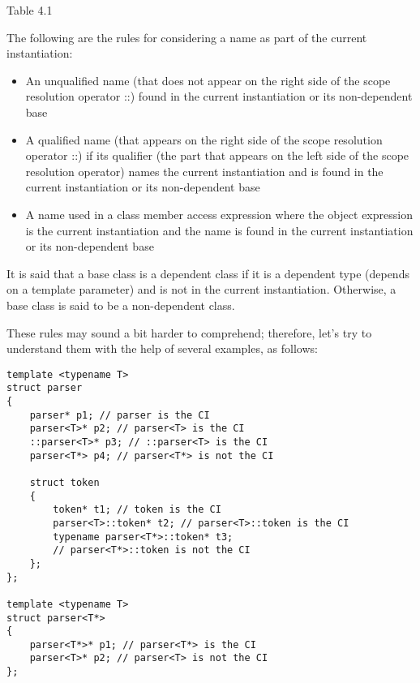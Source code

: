 \begin{center}
Table 4.1
\end{center}

The following are the rules for considering a name as part of the current instantiation:

\begin{itemize}
\item
An unqualified name (that does not appear on the right side of the scope resolution operator ::) found in the current instantiation or its non-dependent base

\item
A qualified name (that appears on the right side of the scope resolution operator ::) if its qualifier (the part that appears on the left side of the scope resolution operator) names the current instantiation and is found in the current instantiation or its non-dependent base

\item
A name used in a class member access expression where the object expression is the current instantiation and the name is found in the current instantiation or its non-dependent base
\end{itemize}

\begin{tcolorbox}[breakable,enhanced jigsaw,colback=blue!5!white,colframe=blue!75!black,title={Note}]
It is said that a base class is a dependent class if it is a dependent type (depends on a template parameter) and is not in the current instantiation. Otherwise, a base class is said to be a non-dependent class.
\end{tcolorbox}

These rules may sound a bit harder to comprehend; therefore, let’s try to understand them with the help of several examples, as follows:

\begin{lstlisting}[style=styleCXX]
template <typename T>
struct parser
{
	parser* p1; // parser is the CI
	parser<T>* p2; // parser<T> is the CI
	::parser<T>* p3; // ::parser<T> is the CI
	parser<T*> p4; // parser<T*> is not the CI
	
	struct token
	{
		token* t1; // token is the CI
		parser<T>::token* t2; // parser<T>::token is the CI
		typename parser<T*>::token* t3;
		// parser<T*>::token is not the CI
	};
};

template <typename T>
struct parser<T*>
{
	parser<T*>* p1; // parser<T*> is the CI
	parser<T>* p2; // parser<T> is not the CI
};
\end{lstlisting}

